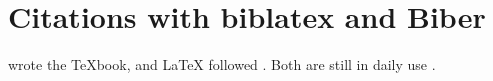 \documentclass{article}
\begin{document}
\section{Citations with biblatex and Biber}

\textcite{knuth1984} wrote the \TeX book, and \LaTeX{} followed
\parencite{lamport1994}. Both are still in daily use \parencite[see][chap.~1]{knuth1984}.

\printbibliography
\end{document}
